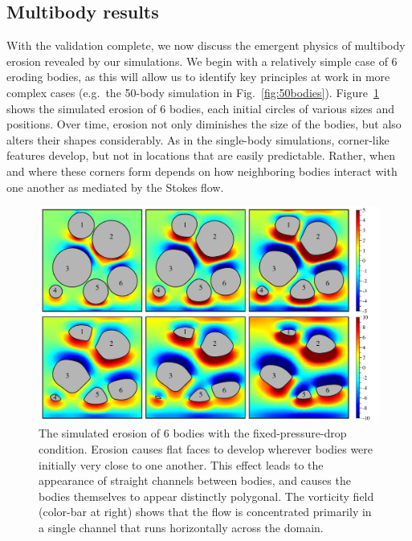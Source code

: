 \documentclass[preprint, 10pt]{elsarticle}
\begin{document}
\subsection{Multibody results}

With the validation complete, we now discuss the emergent physics of multibody erosion revealed by our simulations. We begin with a relatively simple case of 6 eroding bodies, as this will allow us to identify key principles at work in more complex cases (e.g.~the 50-body simulation in Fig.~\ref{fig:50bodies}). Figure~\ref{fig:06bodies} shows the simulated erosion of 6 bodies, each initial circles of various sizes and positions. Over time, erosion not only diminishes the size of the bodies, but also alters their shapes considerably. As in the single-body simulations, corner-like features develop, but not in locations that are easily predictable. Rather, when and where these corners form depends on how neighboring bodies interact with one another as mediated by the Stokes flow.

\begin{figure}%
\begin{center}
\includegraphics[width = 0.80 \textwidth]{./figs/06bod.pdf}
\caption{\label{fig:06bodies} The simulated erosion of 6 bodies with the fixed-pressure-drop condition. Erosion causes flat faces to develop wherever bodies were initially very close to one another. This effect leads to the appearance of straight channels between bodies, and causes the bodies themselves to appear distinctly polygonal. The vorticity field (color-bar at right) shows that the flow is concentrated primarily in a single channel that runs horizontally across the domain. }
\end{center}
\end{figure}
\end{document}
